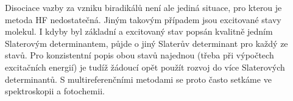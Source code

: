 Disociace vazby za vzniku biradikálů není ale jediná situace, pro kterou je metoda HF nedostatečná. Jiným takovým případem jsou excitované stavy molekul. I kdyby byl základní a excitovaný stav popsán kvalitně jedním Slaterovým determinantem, půjde o jiný Slaterův determinant pro každý ze stavů. Pro konzistentní popis obou stavů najednou (třeba při výpočtech excitačních energií) je tudíž žádoucí opět použít rozvoj do více Slaterových determinantů. S multireferenčními metodami se proto často setkáme ve spektroskopii a fotochemii. 